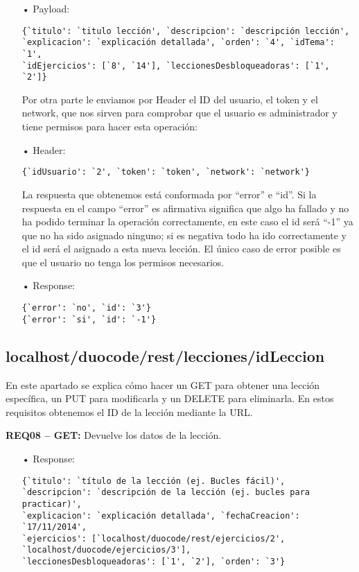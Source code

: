 \begin{itemize}
\item[•]Payload: 
{\codesize
\begin{verbatim}
{`titulo': `titulo lección', `descripcion': `descripción lección', 
`explicacion': `explicación detallada', `orden': `4', `idTema': `1', 
`idEjercicios': [`8', `14'], `leccionesDesbloqueadoras': [`1', `2']}
\end{verbatim}
}

Por otra parte le enviamos por Header el ID del usuario, el token y el network, que nos sirven para comprobar que el usuario es administrador y tiene permisos para hacer esta operación:
\item[•]Header: 
{\codesize
\begin{verbatim}
{`idUsuario': `2', `token': `token', `network': `network'}
\end{verbatim}
}

La respuesta que obtenemos está conformada por ``error'' e ``id''. Si la respuesta en el campo ``error'' es afirmativa significa que algo ha fallado y no ha podido terminar la operación correctamente, en este caso el id será ``-1'' ya que no ha sido asignado ninguno; si es negativa todo ha ido correctamente y el id será el asignado a esta nueva lección. El único caso de error posible es que el usuario no tenga los permisos necesarios.
\item[•]Response: 
{\codesize
\begin{verbatim}
{`error': `no', `id': `3'}
{`error': `si', `id': `-1'}
\end{verbatim}
}
\end{itemize}

\subsection{localhost/duocode/rest/lecciones/idLeccion}
En este apartado se explica cómo hacer un GET para obtener una lección específica, un PUT para modificarla y un DELETE para eliminarla.
En estos requisitos obtenemos el ID de la lección mediante la URL.
\vspace{1em}


\textbf{REQ08 – GET:} Devuelve los datos de la lección.

\begin{itemize}
\item[•]Response:
{\codesize
\begin{verbatim}
{`titulo': `título de la lección (ej. Bucles fácil)', 
`descripcion': `descripción de la lección (ej. bucles para practicar)', 
`explicacion': `explicación detallada', `fechaCreacion': `17/11/2014',
`ejercicios': [`localhost/duocode/rest/ejercicios/2', 
`localhost/duocode/ejercicios/3'], 
`leccionesDesbloqueadoras': [`1', `2'], `orden': `3'}
\end{verbatim}
}
\end{itemize}

